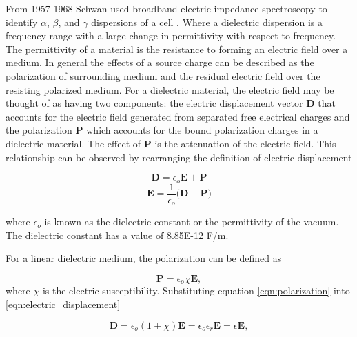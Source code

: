  \par From 1957-1968 Schwan used broadband electric impedance spectroscopy to identify $\alpha$, $\beta$, and $\gamma$ dispersions of a cell \cite{schwan_h_p_electrical_1957,schwan_h_p_electrical_1963,schwan_electrical_1994}. Where a dielectric dispersion is a frequency range with a large change in permittivity with respect to frequency. The permittivity of a material is the resistance to forming an electric field over a medium. In general the effects of a source charge can be described as the polarization of surrounding medium and the residual electric field over the resisting polarized medium. For a dielectric material, the electric field may be thought of as having two components: the electric displacement vector $\boldsymbol{D}$ that accounts for the electric field generated from separated free electrical charges and the polarization $\boldsymbol{P}$ which accounts for the bound polarization charges in a dielectric material. The effect of $\boldsymbol{P}$ is the attenuation of the electric field. This relationship can be observed by rearranging the definition of electric displacement
 
 \begin{equation}
     \boldsymbol{D} = \epsilon_o \boldsymbol{E} + \boldsymbol{P}
     \label{eqn:electric_displacement}
 \end{equation}
 \begin{equation}
    \boldsymbol{E} = \frac{1}{\epsilon_o}\Big(\boldsymbol{D} - \boldsymbol{P}\Big)
 \end{equation}
 
 \noindent where $\epsilon_o$ is known as the dielectric constant or the permittivity of the vacuum. The dielectric constant has a value of 8.85E-12 F/m.
 
 \par For a linear dielectric medium, the polarization can be defined as 
 
 \begin{equation}
     \boldsymbol{P} = \epsilon_o\chi\boldsymbol{E},
     \label{eqn:polarization}
 \end{equation}
 \noindent where $\chi$ is the electric susceptibility. Substituting equation \ref{eqn:polarization} into \ref{eqn:electric_displacement}
 
 \begin{equation}
    \boldsymbol{D} = \epsilon_o(1+\chi)\boldsymbol{E} = \epsilon_o \epsilon_r \boldsymbol{E}=\epsilon\boldsymbol{E},
 \end{equation}
 
